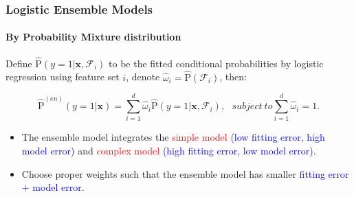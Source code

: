 \documentclass{beamer}
\begin{document}
\begin{frame}
\frametitle{ Logistic Ensemble Models }
\framesubtitle{By Probability Mixture distribution}

Define $ \hat{\mathrm{P}}(y=1 | \pmb{x}, \mathcal{F}_i)$ to be the fitted conditional probabilities by logistic regression using feature set $i$, denote $\hat{\omega}_i = \hat{\mathrm{P}}(\mathcal{F}_i)$, then:

\begin{equation*}
\hat{\mathrm{P}}^{(en)}(y=1 | \pmb{x}) = \sum_{i=1}^{d} \hat{\omega}_i  \hat{\mathrm{P}}(y=1 | \pmb{x}, \mathcal{F}_i), \ \ \ subject \ to \sum_{i=1}^d \hat{\omega}_i = 1.
\end{equation*}

\vspace{1em}

\begin{itemize}
\item The ensemble model integrates the \textcolor{red}{simple model} \textcolor{blue}{(low fitting error, high model error)} and \textcolor{red}{complex model} \textcolor{blue}{(high fitting error, low model error)}.
\item Choose proper weights such that the ensemble model has smaller \textcolor{blue}{fitting error + model error}.
\end{itemize}
\end{frame}
\end{document}
